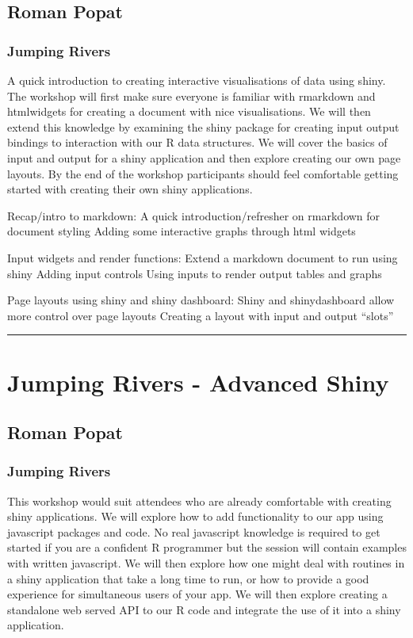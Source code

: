 \documentclass [12pt]{article}
\begin{document}
\subsection*{Roman Popat}
\subsubsection*{Jumping Rivers}

A quick introduction to creating interactive visualisations of data using shiny. The workshop will first make sure everyone is familiar with rmarkdown and htmlwidgets for creating a document with nice visualisations. We will then extend this knowledge by examining the shiny package for creating input output bindings to interaction with our R data structures. We will cover the basics of input and output for a shiny application and then explore creating our own page layouts. By the end of the workshop participants should feel comfortable getting started with creating their own shiny applications.

Recap/intro to markdown: A quick introduction/refresher on rmarkdown for document styling Adding some interactive graphs through html widgets

Input widgets and render functions: Extend a markdown document to run using shiny Adding input controls Using inputs to render output tables and graphs

Page layouts using shiny and shiny dashboard: Shiny and shinydashboard allow more control over page layouts Creating a layout with input and output “slots”

\noindent\rule{\textwidth}{1pt}
\section{Jumping Rivers - Advanced Shiny}
\subsection*{Roman Popat}
\subsubsection*{Jumping Rivers}

This workshop would suit attendees who are already comfortable with creating shiny applications. We will explore how to add functionality to our app using javascript packages and code. No real javascript knowledge is required to get started if you are a confident R programmer but the session will contain examples with written javascript. We will then explore how one might deal with routines in a shiny application that take a long time to run, or how to provide a good experience for simultaneous users of your app. We will then explore creating a standalone web served API to our R code and integrate the use of it into a shiny application.
\end{document}
